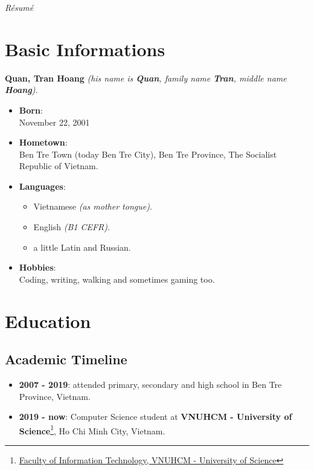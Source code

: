 \documentclass{article}
\renewcommand{\maketitle}{
    \begin{center}
        {\huge\bfseries\theauthor}
        \linebreak\linebreak
        \itshape{R\'esum\'e}
    \end{center}
}
\begin{document}
    \author{Quan, Tran Hoang}
    \maketitle

    \section{Basic Informations}
        {\bfseries Quan, Tran Hoang} {\itshape{(his name is {\bfseries{Quan}}, family name {\bfseries{Tran}}, middle name {\bfseries{Hoang}})}}.
        \begin{itemize}
            \item {\bfseries{Born}}: \\
                November 22, 2001
            \item {\bfseries{Hometown}}: \\
                Ben Tre Town (today Ben Tre City), Ben Tre Province, The Socialist Republic of Vietnam.
            \item {\bfseries{Languages}}:
                \begin{itemize}
                    \item Vietnamese {\itshape{(as mother tongue)}}.
                    \item English {\itshape{(B1 CEFR)}}.
                    \item a little Latin and Russian.
                \end{itemize}
            \item {\bfseries{Hobbies}}: \\
                Coding, writing, walking and sometimes gaming too.
        \end{itemize}

    \section{Education}
        \subsection{Academic Timeline}
            \begin{itemize}
                \item {\bfseries{2007 - 2019}}:
                attended primary, secondary and high school in Ben Tre Province, Vietnam.
                \item {\bfseries{2019 - now}}: Computer Science student at \textbf{VNUHCM - University of Science}\footnote{\href{https://www.fit.hcmus.edu.vn}{Faculty of Information Technology, VNUHCM - University of Science}}, Ho Chi Minh City, Vietnam.
            \end{itemize}
\end{document}
